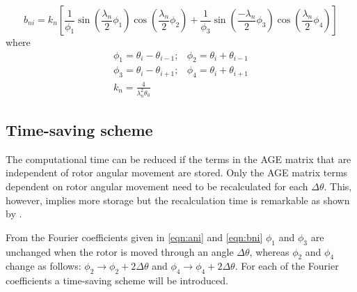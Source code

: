 \begin{equation}\label{eqn:bni}
    b_{ni}=k_{n}
    \left[
        \frac{1}{\phi_{1}}
        \sin\left(\frac{\lambda_{n}}{2}\phi_{1}\right) 
        \cos\left(\frac{\lambda_{n}}{2}\phi_{2}\right) + 
        \frac{1}{\phi_{3}}
        \sin\left(\frac{-\lambda_{n}}{2}\phi_{3}\right)
        \cos\left(\frac{\lambda_{n}}{2}\phi_{4}\right)
    \right]
\end{equation}
where
\begin{eqnarray}\label{eqn:theta}
  \phi_{1} = \theta_{i}-\theta_{i-1};        &  
  \phi_{2} = \theta_{i}+\theta_{i-1}         \nonumber \\  
  \phi_{3} = \theta_{i}-\theta_{i+1};        &  
  \phi_{4} = \theta_{i}+\theta_{i+1}         \nonumber \\
  k_{n}    = \frac{4}{\lambda^{2}_{n}\theta_{0}} \nonumber & \;
\end{eqnarray}

\subsection{Time-saving scheme}
\label{subsec:time_saving}
The computational time can be reduced if the terms in the AGE matrix that are independent of 
rotor angular movement are stored. Only the AGE matrix terms dependent on rotor angular movement 
need to be recalculated for each $\Delta\theta$. This, however, implies more storage  but the 
recalculation time is remarkable as shown by \cite{flack_1994}. 

From the Fourier coefficients given in \eqref{eqn:ani} and \eqref{eqn:bni} 
$\phi_1$ and $\phi_3$ are unchanged when the rotor is moved through an
angle $\Delta\theta$, whereas $\phi_2$ and $\phi_4$ change as follows: 
$\phi_2\rightarrow\phi_2+2\Delta\theta$ and 
$\phi_4\rightarrow\phi_4+2\Delta\theta$. For each of the Fourier coefficients a time-saving scheme will be introduced.

